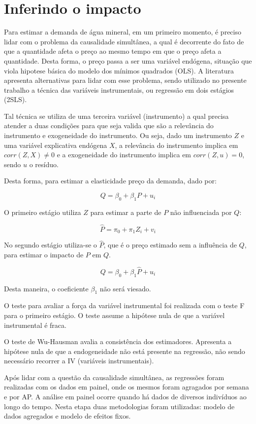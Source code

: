 \documentclass[
  12pt,
]{book}
\begin{document}
\hypertarget{inferindo-o-impacto}{%
\chapter{Inferindo o impacto}\label{inferindo-o-impacto}}

Para estimar a demanda de água mineral, em um primeiro momento, é preciso lidar com o problema da causalidade simultânea, a qual é decorrente do fato de que a quantidade afeta o preço ao mesmo tempo em que o preço afeta a quantidade. Desta forma, o preço passa a ser uma variável endógena, situação que viola hipotese básica do modelo dos mínimos quadrados (OLS). A literatura apresenta alternativas para lidar com esse problema, sendo utilizado no presente trabalho a técnica das variáveis instrumentais, ou regressão em dois estágios (2SLS).

Tal técnica se utiliza de uma terceira variável (instrumento) a qual precisa atender a duas condições para que seja valida \citep{stockwatson} que são a relevância do instrumento e exogeneidade do instrumento. Ou seja, dado um instrumento \(Z\) e uma variável explicativa endógena \(X\), a relevância do instrumento implica em \(corr(Z,X) \not= 0\) e a exogeneidade do instrumento implica em \(corr(Z,u)=0\), sendo \(u\) o resíduo.

Desta forma, para estimar a elasticidade preço da demanda, dado por:

\[ Q = \beta_0 + \beta_1P + u_i \]

O primeiro estágio utiliza \(Z\) para estimar a parte de \(P\) não influenciada por \(Q\):

\[ \hat{P} = \pi_0 + \pi_1Z_i + v_i\]

No segundo estágio utiliza-se o \(\hat{P}\), que é o preço estimado sem a influência de \(Q\), para estimar o impacto de \(P\) em \(Q\).

\[ Q = \beta_0 + \beta_1\hat{P} + u_i  \]

Desta maneira, o coeficiente \(\beta_1\) não será viesado.

O teste para avaliar a força da variável instrumental foi realizada com o teste F para o primeiro estágio. O teste assume a hipótese nula de que a variável instrumental é fraca.

O teste de Wu-Hausman avalia a consistência dos estimadores. Apresenta a hipótese nula de que a endogeneidade não está presente na regressão, não sendo necessário recorrer a IV (variáveis instrumentais).

Após lidar com a questão da causalidade simultânea, as regressões foram realizadas com os dados em painel\citep{colonescu}, onde os mesmos foram agragados por semana e por AP. A análise em painel ocorre quando há dados de diversos indivíduos ao longo do tempo. Nesta etapa duas metodologias foram utilizadas: modelo de dados agregados e modelo de efeitos fixos.
\end{document}
